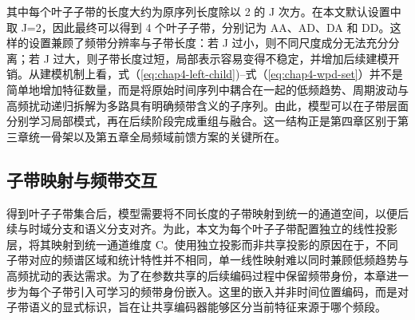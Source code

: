 其中每个叶子子带的长度大约为原序列长度除以 2 的 J 次方。在本文默认设置中取 J=2，因此最终可以得到 4 个叶子子带，分别记为 AA、AD、DA 和 DD。这样的设置兼顾了频带分辨率与子带长度：若 J 过小，则不同尺度成分无法充分分离；若 J 过大，则子带长度过短，局部表示容易变得不稳定，并增加后续建模开销。从建模机制上看，式（\ref{eq:chap4-left-child})--式（\ref{eq:chap4-wpd-set}）并不是简单地增加特征数量，而是将原始时间序列中耦合在一起的低频趋势、周期波动与高频扰动递归拆解为多路具有明确频带含义的子序列。由此，模型可以在子带层面分别学习局部模式，再在后续阶段完成重组与融合。这一结构正是第四章区别于第三章统一骨架以及第五章全局频域前馈方案的关键所在。 \subsection{子带映射与频带交互} 得到叶子子带集合后，模型需要将不同长度的子带映射到统一的通道空间，以便后续与时域分支和语义分支对齐。为此，本文为每个叶子子带配置独立的线性投影层，将其映射到统一通道维度 C。使用独立投影而非共享投影的原因在于，不同子带对应的频谱区域和统计特性并不相同，单一线性映射难以同时兼顾低频趋势与高频扰动的表达需求。为了在参数共享的后续编码过程中保留频带身份，本章进一步为每个子带引入可学习的频带身份嵌入。这里的嵌入并非时间位置编码，而是对子带语义的显式标识，旨在让共享编码器能够区分当前特征来源于哪个频段。

